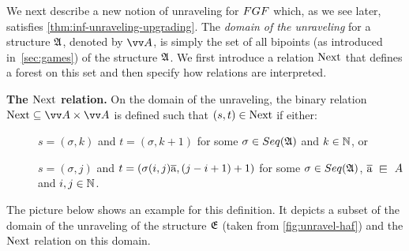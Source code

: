 We next describe a new notion of unraveling for $\FGF$ which, as we see later, satisfies \cref{thm:inf-unraveling-upgrading}.
The \emph{domain of the unraveling} for a structure ${\mathfrak{A}}$, denoted by $\unraveldom{A}$, is simply the set of all bipoints (as introduced in~\ref{sec:games}) of the structure ${\mathfrak{A}}$.
We first introduce a relation $\mathrm{Next}$ that defines a forest on this set and then specify how relations are interpreted.

\noindent \textbf{The $\mathrm{Next}$ relation.}
On the domain of the unraveling, the binary relation $\relNext \subseteq \unraveldom{A} \times \unraveldom{A}$ is defined such that $(s, t) \in \mathrm{Next}$ if either:
\begin{description}
  \item[] $s = (\sigma, k)$ and $t = (\sigma, k + 1)$ for some $\sigma \in \Seq{A}$ and $k \in {\mathbb{N}}$, or
  \item[] $s = (\sigma, j)$ and $t = (\sigma(i,j)\overline{\mathrm{a}}, (j-i+1) + 1)$ for some $\sigma \in \Seq{A}$, $\elemtuplea \sqin A$ and $i,j \in {\mathbb{N}}$.
\end{description}
The picture below shows an example for this definition.
It depicts a subset of the domain of the unraveling of the structure ${\mathfrak{E}}$ (taken from \cref{fig:unravel-haf}) and the $\mathrm{Next}$ relation on this domain.

\begin{figure}[H]
  \centering
  
\end{figure}


